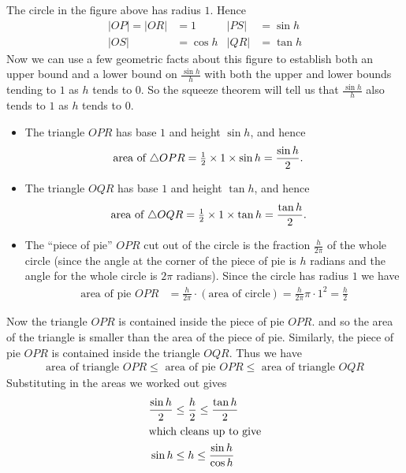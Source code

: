 \noindent The circle in the figure above has radius $1$. Hence
\begin{align*}
|OP|=|OR|&=1 &
|PS|&=\sin h\\
|OS|&= \cos h &
|QR|&=\tan h
\end{align*}
Now we can use a few geometric facts about this figure to establish both
an upper bound and a lower bound on $\frac{\sin h}{h}$ with both the upper
and lower bounds tending to $1$ as $h$ tends to $0$. So the squeeze
theorem will tell us that $\frac{\sin h}{h}$ also tends to $1$ as $h$
tends to $0$.
\begin{itemize}
 \item The triangle $OPR$ has base $1$ and height $\sin h$, and hence
\begin{align*}
\text{area of }\triangle OPR &= \tfrac{1}{2}\times1\times\sin h=\frac{\sin h}{2}.
\end{align*}
 \item The triangle $OQR$ has base $1$ and height $\tan h$, and hence
\begin{align*}
\text{area of }\triangle OQR &= \tfrac{1}{2}\times1\times\tan h=\frac{\tan h}{2}.
\end{align*}
 \item The ``piece of pie'' $OPR$ cut out of the circle  is the fraction
$\frac{h}{2\pi}$ of the whole circle (since the angle at the corner of
the piece of pie is $h$ radians and the angle for the whole circle is
$2\pi$ radians). Since the circle has radius $1$ we have
\begin{align*}
\text{area of pie } OPR &=
\frac{h}{2\pi} \cdot
(\text{area of circle}) = \frac{h}{2\pi} \pi \cdot 1^2= \frac{h}{2}
\end{align*}
\end{itemize}
Now the triangle $OPR$ is contained inside the piece of pie $OPR$. and so the area of the
triangle is smaller than the area of the piece of pie. Similarly, the piece of pie $OPR$
is contained inside the triangle $OQR$. Thus we have
\begin{align*}
  \text{area of triangle } OPR \leq \text{ area of pie } OPR
                              \leq \text{ area of triangle } OQR
\end{align*}
Substituting in the areas we worked out gives
\begin{align*}
  \frac{\sin h}{2}  &\leq \frac{h}{2}  \leq \frac{\tan h}{2}  \\
\intertext{which cleans up to give}
  \sin h  &\leq h  \leq \frac{\sin h}{\cos h} %
\end{align*}
